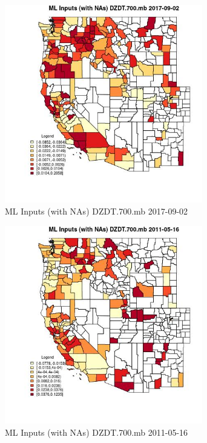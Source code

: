 \clearpage 

\begin{figure} 
\centering  
\includegraphics[width=0.77\textwidth]{Code_Outputs/Report_ML_input_PM25_Step4_part_e_de_duplicated_aves_compiled_2019-05-21wNAs_CountyDZDT700mbMean2017-09-02.jpg} 
\caption{\label{fig:Report_ML_input_PM25_Step4_part_e_de_duplicated_aves_compiled_2019-05-21wNAsCountyDZDT700mbMean2017-09-02}ML Inputs (with NAs) DZDT.700.mb 2017-09-02} 
\end{figure} 
 

\begin{figure} 
\centering  
\includegraphics[width=0.77\textwidth]{Code_Outputs/Report_ML_input_PM25_Step4_part_e_de_duplicated_aves_compiled_2019-05-21wNAs_CountyDZDT700mbMean2011-05-16.jpg} 
\caption{\label{fig:Report_ML_input_PM25_Step4_part_e_de_duplicated_aves_compiled_2019-05-21wNAsCountyDZDT700mbMean2011-05-16}ML Inputs (with NAs) DZDT.700.mb 2011-05-16} 
\end{figure} 
 

